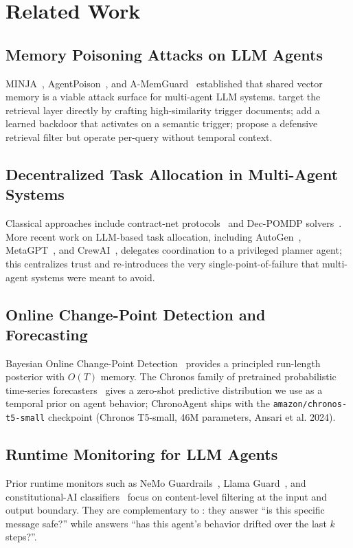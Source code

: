 \section{Related Work}
\label{sec:related}

\subsection{Memory Poisoning Attacks on LLM Agents}
\label{sec:related:attacks}

MINJA~\citep{minja}, AgentPoison~\citep{agentpoison}, and
A-MemGuard~\citep{amemguard} established that shared vector memory is
a viable attack surface for multi-agent LLM systems.
\citet{minja} target the retrieval layer directly by crafting
high-similarity trigger documents; \citet{agentpoison} add a learned
backdoor that activates on a semantic trigger; \citet{amemguard}
propose a defensive retrieval filter but operate per-query without
temporal context.

\subsection{Decentralized Task Allocation in Multi-Agent Systems}
\label{sec:related:alloc}

Classical approaches include contract-net protocols~\citep{contractnet}
and Dec-POMDP solvers~\citep{decpomdp}. More recent work on LLM-based
task allocation, including AutoGen~\citep{autogen},
MetaGPT~\citep{metagpt}, and CrewAI~\citep{crewai}, delegates
coordination to a privileged planner agent; this centralizes trust
and re-introduces the very single-point-of-failure that multi-agent
systems were meant to avoid.

\subsection{Online Change-Point Detection and Forecasting}
\label{sec:related:cpd}

Bayesian Online Change-Point Detection~\citep{adams2007bocpd} provides
a principled run-length posterior with $O(T)$ memory. The Chronos
family of pretrained probabilistic time-series
forecasters~\citep{chronos} gives a zero-shot predictive distribution
we use as a temporal prior on agent behavior; ChronoAgent ships with
the \texttt{amazon/chronos-t5-small} checkpoint (Chronos T5-small, 46M
parameters, Ansari et al. 2024).

\subsection{Runtime Monitoring for LLM Agents}
\label{sec:related:monitoring}

Prior runtime monitors such as NeMo Guardrails~\citep{nemoguardrails},
Llama Guard~\citep{llamaguard}, and constitutional-AI
classifiers~\citep{constitutionalai} focus on content-level filtering
at the input and output boundary. They are complementary to \sys{}:
they answer ``is this specific message safe?'' while \sys{} answers
``has this agent's behavior drifted over the last $k$ steps?''.
